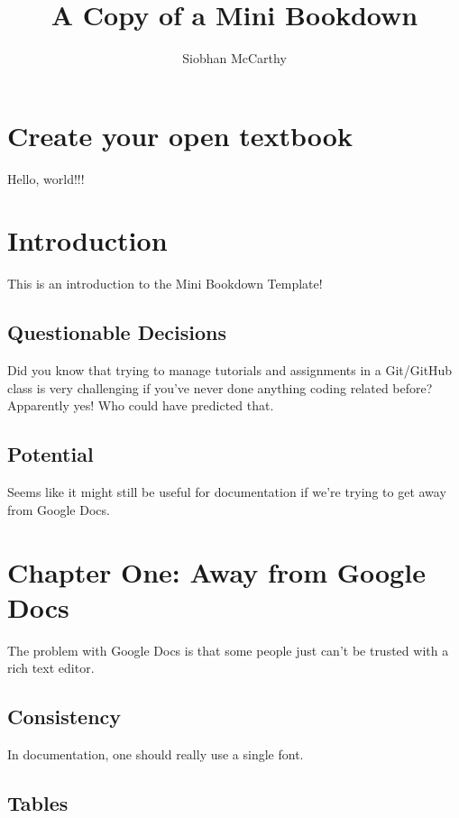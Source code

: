 \documentclass[
  openany]{book}
\title{A Copy of a Mini Bookdown}
\author{Siobhan McCarthy}
\date{}
\begin{document}
\maketitle

{
\setcounter{tocdepth}{1}
\tableofcontents
}
\chapter{Create your open textbook}\label{create-your-open-textbook}

Hello, world!!!

\chapter{Introduction}\label{introduction}

This is an introduction to the Mini Bookdown Template!

\section{Questionable Decisions}\label{questionable-decisions}

Did you know that trying to manage tutorials and assignments in a Git/GitHub class is very challenging if you've never done anything coding related before? Apparently yes! Who could have predicted that.

\section{Potential}\label{potential}

Seems like it might still be useful for documentation if we're trying to get away from Google Docs.

\chapter{Chapter One: Away from Google Docs}\label{chapter-one-away-from-google-docs}

The problem with Google Docs is that some people just can't be trusted with a rich text editor.

\section{Consistency}\label{consistency}

In documentation, one should really use a single font.

\section{Tables}\label{tables}
\end{document}
